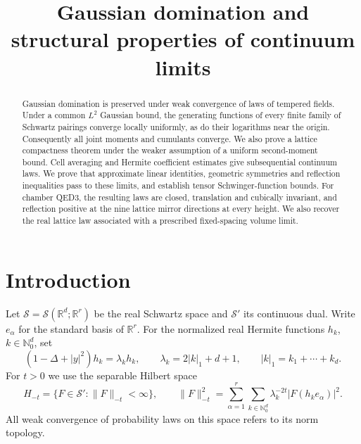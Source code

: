   \RequirePackage[backend=biber,style=alphabetic,backref=true,
    giveninits=true,isbn=false,date=year]{biblatex}
  
  \setcounter{biburlnumpenalty}{100}
  \setcounter{biburllcpenalty}{100}
  \setcounter{biburlucpenalty}{100}
  \renewcommand*{\bibfont}{\footnotesize}
\makeatother
\newcommand{\R}{\mathbb R}
\newcommand{\Z}{\mathbb Z}
\newcommand{\N}{\mathbb N}
\newcommand{\E}{\mathbb E}
\newcommand{\dd}{\mathrm d}


\newcommand{\C}{\mathbb C}
\title[Gaussian domination and continuum limits]
 {Gaussian domination and structural properties of continuum limits}
\date{}

\begin{abstract}
Gaussian domination is preserved under weak convergence of laws of
tempered fields. Under a common $L^2$ Gaussian bound, the generating
functions of every finite family of Schwartz pairings converge
locally uniformly, as do their logarithms near the origin.
Consequently all joint moments and cumulants converge. We also
prove a lattice compactness theorem under the weaker assumption of
a uniform second-moment bound. Cell averaging and Hermite coefficient
estimates give subsequential continuum laws. We prove that approximate
linear identities, geometric symmetries and reflection inequalities
pass to these limits, and establish tensor Schwinger-function bounds.
For chamber QED3, the resulting laws are closed, translation and
cubically invariant, and reflection positive at the nine lattice
mirror directions at every height. We also recover the real lattice
law associated with a prescribed fixed-spacing volume limit.
\end{abstract}
\maketitle
\tableofcontents

\section{Introduction}\label{sec:introduction}
Let $\mathcal S=\mathcal S(\R^d;\R^r)$ be the real Schwartz space
and $\mathcal S'$ its continuous dual. Write $e_\alpha$ for the
standard basis of $\R^r$. For the normalized real Hermite functions
$h_k$, $k\in\N_0^d$, set
\[
 (1-\Delta+|y|^2)h_k=\lambda_k h_k,\qquad
 \lambda_k=2|k|_1+d+1,\qquad |k|_1=k_1+\cdots+k_d.
\]
For $t>0$ we use the separable Hilbert space
\begin{equation}\label{eq:hermite-space}
 H_{-t}=\{F\in\mathcal S':\|F\|_{-t}<\infty\},\qquad
 \|F\|_{-t}^2=
 \sum_{\alpha=1}^r\sum_{k\in\N_0^d}
       \lambda_k^{-2t}|F(h_ke_\alpha)|^2.
\end{equation}
All weak convergence of probability laws on this space refers to
its norm topology.

